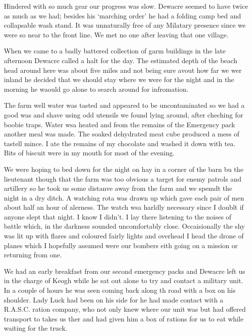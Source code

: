 Hindered with so much gear our progress was slow. \Lieutenant Dewacre seemed
to have twice as much as we had; besides his `marching order' he had a
folding camp bed and collapsable wash stand. It was unnaturally free
of any Milatary presence since we were so near to the front line. We
met no one after leaving that one village.

When we came to a badly battered collection of garm buildings in the
late afternoon \lieutenant Dewacre called a halt for the day. The estimated
depth of the beach head around here was about five miles and not being
sure avout how far we wer inland he decided that we should stay where
we were for the night and in the morning he waould go alone to search
around for infromation.

The farm well water was tasted and appeared to be uncontaminated so we
had a good was and shave using odd utensils we found lying around,
after cheching for boobie traps. Water wsa heated and feom the remains
of the Emergency pack another meal was made. The soaked dehydrated
meat cube produced a mess of tastell mince. I ate the remains of my
chocolate and washed it down with tea. Bits of biscuit were in my
mouth for most of the evening.

We were hoping to bed down for the night on hay in a corner of the
barn bu the lieutenant though that the farm was too obvious a target for
enemy patrols and artillery so he took us some distanve away from the
farm and we spemdt the night in a dry ditch. A watching rota was drawn
up which gave each pair of men about half an hour of alerness. The
watch wsa harldly necessary since I doublt if anyone slept that
night. I know I didn't. I lay there listening to the noises of battle
which, in the darkness sounded uncomfortably close. Occaisionally the
shy was lit up with flares and coloured fairly lights and overhead I
head the drone of planes which I hopefully assumed were our bombers
eith going on a mission or returning from one.

We had an early breakfast from our second emergency packs and
\lieutenant Dewacre left us in the charge of \corporal Keogh while he sat out
alone to try and contact a military unit. In a couple of hours he was
seen coming back along th road with a box on his shoulder. Lady Luck
had been on his side for he had made contact with a R.A.S.C. ration
company, who not only knew where our unit was but had offered
transport to takes us ther and had given him a box of rations for us
to eat while waiting for the truck.

